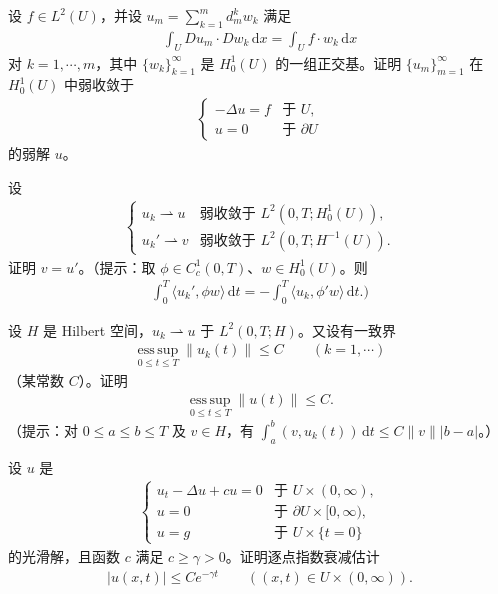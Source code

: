 \documentclass[../../main.tex]{subfiles}
\begin{document}
\begin{exercise}\label{exercise:ch07-5-4}设 $f\in L^2(U)$，并设 $u_m=\sum_{k=1}^m d_m^k w_k$ 满足
\begin{align*}
\int_U Du_m\cdot Dw_k\,\mathrm{d}x=\int_U f\cdot w_k\,\mathrm{d}x
\end{align*}
对 $k=1,\cdots,m$，其中 $\{w_k\}_{k=1}^\infty$ 是 $H^1_0(U)$ 的一组正交基。证明 $\{u_m\}_{m=1}^\infty$ 在 $H^1_0(U)$ 中弱收敛于
\begin{align*}
\begin{cases}
-\Delta u=f & \text{于 } U,\\
u=0 & \text{于 } \partial U
\end{cases}
\end{align*}
的弱解 $u$。
\end{exercise}

\begin{exercise}\label{exercise:ch07-5-5}
设
\begin{align*}
\begin{cases}
u_k\rightharpoonup u & \text{弱收敛于 } L^2(0,T;H^1_0(U)),\\
u_k'\rightharpoonup v & \text{弱收敛于 } L^2(0,T;H^{-1}(U)).
\end{cases}
\end{align*}
证明 $v=u'$。（提示：取 $\phi\in C_c^1(0,T)$、$w\in H^1_0(U)$。则
\begin{align*}
\int_0^T\langle u_k',\phi w\rangle\,\mathrm{d}t=-\int_0^T\langle u_k,\phi' w\rangle\,\mathrm{d}t.)
\end{align*}
\end{exercise}

\begin{exercise}\label{exercise:ch07-5-6}
设 $H$ 是 Hilbert 空间，$u_k\rightharpoonup u$ 于 $L^2(0,T;H)$。又设有一致界
\begin{align*}
\operatorname*{ess\,sup}_{0\leqslant t\leqslant T}\|u_k(t)\|\leqslant C\qquad (k=1,\cdots)
\end{align*}
（某常数 $C$）。证明
\begin{align*}
\operatorname*{ess\,sup}_{0\leqslant t\leqslant T}\|u(t)\|\leqslant C.
\end{align*}
（提示：对 $0\leqslant a\leqslant b\leqslant T$ 及 $v\in H$，有 $\int_a^b(v,u_k(t))\,\mathrm{d}t\leqslant C\|v\||b-a|$。）
\end{exercise}

\begin{exercise}\label{exercise:ch07-5-7}
设 $u$ 是
\begin{align*}
\begin{cases}
u_t-\Delta u+cu=0 & \text{于 } U\times(0,\infty),\\
u=0 & \text{于 } \partial U\times[0,\infty),\\
u=g & \text{于 } U\times\{t=0\}
\end{cases}
\end{align*}
的光滑解，且函数 $c$ 满足 $c\geqslant\gamma>0$。证明逐点指数衰减估计
\begin{align*}
|u(x,t)|\leqslant Ce^{-\gamma t}\qquad ((x,t)\in U\times(0,\infty)).
\end{align*}
\end{exercise}
\end{document}
